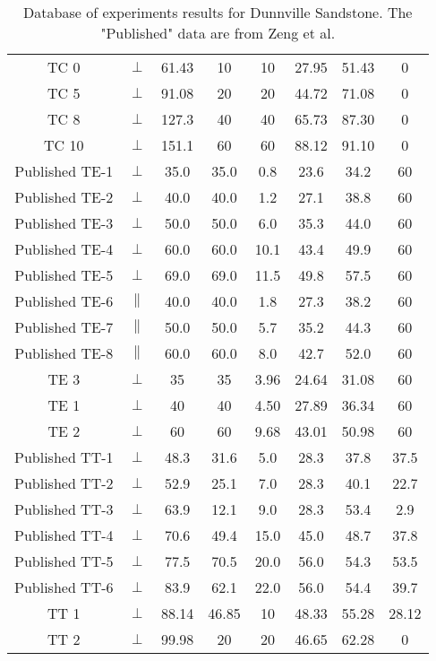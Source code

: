 \begin{table}
\begin{tabular}{cccccccc}
        TC 0  & \(\perp\) & 61.43 & 10 & 10 & 27.95 & 51.43 & 0 \\ 
        TC 5  & \(\perp\) & 91.08 & 20 & 20 & 44.72 & 71.08 & 0 \\ 
        TC 8  & \(\perp\) & 127.3 & 40 & 40 & 65.73 & 87.30 & 0 \\ 
        TC 10 & \(\perp\) & 151.1 & 60 & 60 & 88.12 & 91.10 & 0 \\ 
        \hline
        \hline
        Published TE-1 & \(\perp\) & 35.0 & 35.0 & 0.8 & 23.6 & 34.2 & 60 \\
        Published TE-2 & \(\perp\) & 40.0 & 40.0 & 1.2 & 27.1 & 38.8 & 60 \\
        Published TE-3 & \(\perp\) & 50.0 & 50.0 & 6.0 & 35.3 & 44.0 & 60 \\
        Published TE-4 & \(\perp\) & 60.0 & 60.0 & 10.1 & 43.4 & 49.9 & 60 \\
        Published TE-5 & \(\perp\) & 69.0 & 69.0 & 11.5 & 49.8 & 57.5 & 60 \\
        Published TE-6 & \(\|\) & 40.0 & 40.0 & 1.8 & 27.3 & 38.2 & 60 \\
        Published TE-7 & \(\|\) & 50.0 & 50.0 & 5.7 & 35.2 & 44.3 & 60 \\
        Published TE-8 & \(\|\) & 60.0 & 60.0 & 8.0 & 42.7 & 52.0 & 60 \\
        TE 3  & \(\perp\) & 35 & 35 & 3.96 & 24.64 & 31.08 & 60 \\ 
        TE 1  & \(\perp\) & 40 & 40 & 4.50 & 27.89 & 36.34 & 60 \\ 
        TE 2  & \(\perp\) & 60 & 60 & 9.68 & 43.01 & 50.98 & 60 \\
        \hline
        \hline
        Published TT-1 & \(\perp\) & 48.3 & 31.6 & 5.0 & 28.3 & 37.8 & 37.5 \\
        Published TT-2 & \(\perp\) & 52.9 & 25.1 & 7.0 & 28.3 & 40.1 & 22.7 \\
        Published TT-3 & \(\perp\) & 63.9 & 12.1 & 9.0 & 28.3 & 53.4 & 2.9 \\
        Published TT-4 & \(\perp\) & 70.6 & 49.4 & 15.0 & 45.0 & 48.7 & 37.8 \\
        Published TT-5 & \(\perp\) & 77.5 & 70.5 & 20.0 & 56.0 & 54.3 & 53.5 \\
        Published TT-6 & \(\perp\) & 83.9 & 62.1 & 22.0 & 56.0 & 54.4 & 39.7 \\
        TT 1 & \(\perp\) & 88.14 & 46.85 & 10 & 48.33 & 55.28 & 28.12 \\
        TT 2 & \(\perp\) & 99.98 & 20 & 20 & 46.65 & 62.28 & 0 \\
        \hline
    \end{tabular}
    \captionsetup{justification=centering}
    \caption{Database of experiments results for Dunnville Sandstone. The "Published" data are from Zeng et al. \cite{Zeng2019}}
    \label{tb5:database}
\end{table}

